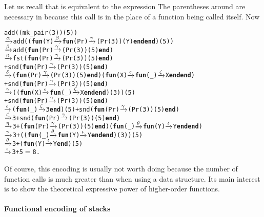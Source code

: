 Let us recall that  is equivalent to
the expression  The parentheses
around  are necessary in \Erlang because this call is
in the place of a function being called itself. Now
\begin{alltt}
add((mk\_pair(3))(5))
  \(\smashedrightarrow{\alpha}\) add((\textbf{fun}(Y) \(\smashedrightarrow{\beta}\) \textbf{fun}(Pr) \(\smashedrightarrow{\gamma}\) (Pr(3))(Y) \textbf{end} \textbf{end})(5))
  \(\smashedrightarrow{\beta}\) add(\textbf{fun}(Pr) \(\smashedrightarrow{\gamma}\) (Pr(3))(5) \textbf{end})
  \(\smashedrightarrow{\kappa}\)   fst(\textbf{fun}(Pr) \(\smashedrightarrow{\gamma}\) (Pr(3))(5) \textbf{end})
     + snd(\textbf{fun}(Pr) \(\smashedrightarrow{\gamma}\) (Pr(3))(5) \textbf{end})
  \(\smashedrightarrow{\delta}\)   (\textbf{fun}(Pr)\(\smashedrightarrow{\gamma}\)(Pr(3))(5) \textbf{end})(\textbf{fun}(X) \(\smashedrightarrow{\epsilon}\) \textbf{fun}(\_) \(\smashedrightarrow{\zeta}\)X \textbf{end} \textbf{end})
     + snd(\textbf{fun}(Pr) \(\smashedrightarrow{\gamma}\) (Pr(3))(5) \textbf{end})
  \(\smashedrightarrow{\gamma}\)   ((\textbf{fun}(X) \(\smashedrightarrow{\epsilon}\) \textbf{fun}(\_) \(\smashedrightarrow{\zeta}\) X \textbf{end} \textbf{end})(3))(5)
     + snd(\textbf{fun}(Pr) \(\smashedrightarrow{\gamma}\) (Pr(3))(5) \textbf{end})
  \(\smashedrightarrow{\epsilon}\) (\textbf{fun}(\_) \(\smashedrightarrow{\zeta}\) 3 \textbf{end})(5) + snd(\textbf{fun}(Pr) \(\smashedrightarrow{\gamma}\) (Pr(3))(5) \textbf{end})
  \(\smashedrightarrow{\zeta}\) 3 + snd(\textbf{fun}(Pr) \(\smashedrightarrow{\gamma}\) (Pr(3))(5) \textbf{end})
  \(\smashedrightarrow{\eta}\) 3 +(\textbf{fun}(Pr)\(\smashedrightarrow{\gamma}\)(Pr(3))(5) \textbf{end})(\textbf{fun}(\_) \(\smashedrightarrow{\theta}\) \textbf{fun}(Y) \(\smashedrightarrow{\iota}\) Y \textbf{end} \textbf{end})
  \(\smashedrightarrow{\gamma}\) 3 + ((\textbf{fun}(\_) \(\smashedrightarrow{\theta}\) \textbf{fun}(Y) \(\smashedrightarrow{\iota}\) Y \textbf{end} \textbf{end})(3))(5)
  \(\smashedrightarrow{\theta}\) 3 + (\textbf{fun}(Y) \(\smashedrightarrow{\iota}\) Y \textbf{end})(5)
  \(\smashedrightarrow{\iota}\) 3 + 5 \(=\) 8.
\end{alltt}
Of course, this encoding is usually not worth doing because the number
of function calls is much greater than when using a data
structure. Its main interest is to show the theoretical expressive
power of higher\hyp{}order functions.

\paragraph{Functional encoding of stacks}

